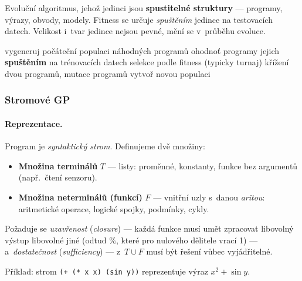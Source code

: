 \documentclass[11pt,a4paper]{article}
\theoremstyle{definition}
\begin{document}
\begin{defbox}
Evoluční algoritmus, jehož jedinci jsou \textbf{spustitelné struktury} ---
programy, výrazy, obvody, modely. Fitness se určuje \emph{spuštěním} jedince
na testovacích datech. Velikost i~tvar jedince nejsou pevné, mění se v~průběhu
evoluce.
\end{defbox}

\begin{algorithm}[!ht]
\caption{Obecné schéma GP}
\begin{algorithmic}[1]
\State vygeneruj počáteční populaci náhodných programů
  \State ohodnoť programy jejich \textbf{spuštěním} na trénovacích datech
  \State selekce podle fitness (typicky turnaj)
  \State křížení dvou programů, mutace programů
  \State vytvoř novou populaci
\EndWhile
\end{algorithmic}
\end{algorithm}

\subsubsection{Stromové GP}

\paragraph{Reprezentace.} Program je \emph{syntaktický strom}. Definujeme dvě
množiny:
\begin{itemize}
\item \textbf{Množina terminálů} $T$ --- listy: proměnné, konstanty, funkce bez
  argumentů (např.\ čtení senzoru).
\item \textbf{Množina neterminálů (funkcí)} $F$ --- vnitřní uzly s~danou
  \emph{aritou}: aritmetické operace, logické spojky, podmínky, cykly.
\end{itemize}
Požaduje se \emph{uzavřenost} (\emph{closure}) --- každá funkce musí umět
zpracovat libovolný výstup libovolné jiné (odtud 
$\%$, které pro nulového dělitele vrací 1) --- a~\emph{dostatečnost}
(\emph{sufficiency}) --- z~$T \cup F$ musí být řešení vůbec vyjádřitelné.

Příklad: strom \texttt{(+ (* x x) (sin y))} reprezentuje výraz $x^2 + \sin y$.
\end{document}
